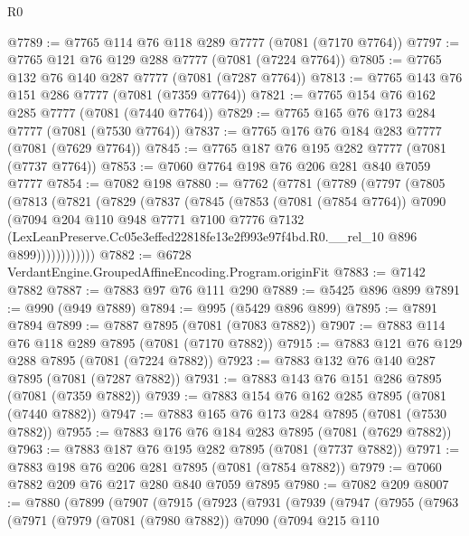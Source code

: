 \begin{lexlean}{R0}
\begin{coremodule}
@7789 := @7765 @114 @76 @118 @289 @7777 (@7081 (@7170 @7764))
@7797 := @7765 @121 @76 @129 @288 @7777 (@7081 (@7224 @7764))
@7805 := @7765 @132 @76 @140 @287 @7777 (@7081 (@7287 @7764))
@7813 := @7765 @143 @76 @151 @286 @7777 (@7081 (@7359 @7764))
@7821 := @7765 @154 @76 @162 @285 @7777 (@7081 (@7440 @7764))
@7829 := @7765 @165 @76 @173 @284 @7777 (@7081 (@7530 @7764))
@7837 := @7765 @176 @76 @184 @283 @7777 (@7081 (@7629 @7764))
@7845 := @7765 @187 @76 @195 @282 @7777 (@7081 (@7737 @7764))
@7853 := @7060 @7764 @198 @76 @206 @281 @840 @7059 @7777
@7854 := @7082 @198
@7880 := @7762
    (@7781
      (@7789
        (@7797
          (@7805
            (@7813
              (@7821
                (@7829
                  (@7837
                    (@7845
                      (@7853
                        (@7081 (@7854 @7764))
                        @7090
                        (@7094
                          @204
                          @110
                          @948
                          @7771
                          @7100
                          @7776
                          @7132
                          (LexLeanPreserve.Cc05e3effed22818fe13e2f993e97f4bd.R0.__rel_10
                            @896
                            @899))))))))))))
@7882 := @6728 VerdantEngine.GroupedAffineEncoding.Program.originFit
@7883 := @7142 @7882
@7887 := @7883 @97 @76 @111 @290
@7889 := @5425 @896 @899
@7891 := @990 (@949 @7889)
@7894 := @995 (@5429 @896 @899)
@7895 := @7891 @7894
@7899 := @7887 @7895 (@7081 (@7083 @7882))
@7907 := @7883 @114 @76 @118 @289 @7895 (@7081 (@7170 @7882))
@7915 := @7883 @121 @76 @129 @288 @7895 (@7081 (@7224 @7882))
@7923 := @7883 @132 @76 @140 @287 @7895 (@7081 (@7287 @7882))
@7931 := @7883 @143 @76 @151 @286 @7895 (@7081 (@7359 @7882))
@7939 := @7883 @154 @76 @162 @285 @7895 (@7081 (@7440 @7882))
@7947 := @7883 @165 @76 @173 @284 @7895 (@7081 (@7530 @7882))
@7955 := @7883 @176 @76 @184 @283 @7895 (@7081 (@7629 @7882))
@7963 := @7883 @187 @76 @195 @282 @7895 (@7081 (@7737 @7882))
@7971 := @7883 @198 @76 @206 @281 @7895 (@7081 (@7854 @7882))
@7979 := @7060 @7882 @209 @76 @217 @280 @840 @7059 @7895
@7980 := @7082 @209
@8007 := @7880
    (@7899
      (@7907
        (@7915
          (@7923
            (@7931
              (@7939
                (@7947
                  (@7955
                    (@7963
                      (@7971
                        (@7979
                          (@7081 (@7980 @7882))
                          @7090
                          (@7094
                            @215
                            @110

\end{coremodule}
\end{lexlean}
